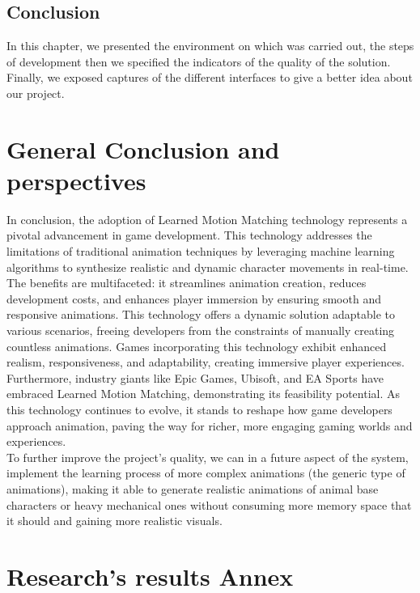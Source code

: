 \documentclass[12pt]{book}
\newenvironment{ConfigureChapter}{
    \centering
        \Centering
        \renewcommand{\thechapter}{\Roman{chapter}}
    }{
    \let\cleardoublepage=\clearpage
    \setcounter{section}{0}
}
\begin{document}
\section*{Conclusion}
In this chapter, we presented the environment on which was carried out, the steps of development then we specified the indicators of the quality of the solution. Finally, we exposed captures of the different interfaces to give a better idea about our project.
\newpage
\begin{ConfigureChapter}
    \chapter{\textbf{General Conclusion and perspectives}}
    \mtcaddchapter{}
\end{ConfigureChapter}
In conclusion, the adoption of Learned Motion Matching technology represents a pivotal advancement in game development. This technology addresses the limitations of traditional animation techniques by leveraging machine learning algorithms to synthesize realistic and dynamic character movements in real-time. The benefits are multifaceted: it streamlines animation creation, reduces development costs, and enhances player immersion by ensuring smooth and responsive animations. This technology offers a dynamic solution adaptable to various scenarios, freeing developers from the constraints of manually creating countless animations. Games incorporating this technology exhibit enhanced realism, responsiveness, and adaptability, creating immersive player experiences. Furthermore, industry giants like Epic Games, Ubisoft, and EA Sports have embraced Learned Motion Matching, demonstrating its feasibility potential. As this technology continues to evolve, it stands to reshape how game developers approach animation, paving the way for richer, more engaging gaming worlds and experiences.\\
To further improve the project's quality, we can in a future aspect of the system, implement the learning process of more complex animations (the generic type of animations), making it able to generate realistic animations of animal base characters or heavy mechanical ones without consuming more memory space that it should and gaining more realistic visuals.   

\appendix 
\begin{ConfigureChapter}
    \chapter{\textbf{Research's results Annex}}
    \minitoc
\end{ConfigureChapter}
\end{document}
